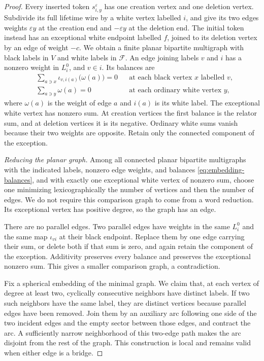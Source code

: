 \begin{proof}
Every inserted token $s_{i,y}^{\varepsilon}$ has one creation vertex
and one deletion vertex.  Subdivide its full lifetime wire by a white
vertex labelled $i$, and give its two edges weights $\varepsilon y$
at the creation end and $-\varepsilon y$ at the deletion end.  The
initial token instead has an exceptional white endpoint labelled $f$,
joined to its deletion vertex by an edge of weight $-c$.  We obtain
a finite planar bipartite multigraph with black labels in $V$ and
white labels in $\mathcal F$.  An edge joining labels $v$ and $i$
has a nonzero weight in $L_i^0$, and $v\in i$.  Its balances are
\begin{equation}\label{eq:embedding-balances}
\begin{aligned}
  &\sum_{a\ni x}\iota_{v,i(a)}\bigl(\omega(a)\bigr)=0
    &&\text{at each black vertex $x$ labelled $v$},\\
  &\sum_{a\ni y}\omega(a)=0
    &&\text{at each ordinary white vertex $y$},
\end{aligned}
\end{equation}
where $\omega(a)$ is the weight of edge $a$ and $i(a)$ is its white
label.  The exceptional white vertex has nonzero sum.  At creation
vertices the first balance is the relator sum, and at deletion
vertices it is its negative.  Ordinary white sums vanish because
their two weights are opposite.  Retain only the connected component
of the exception.

\emph{Reducing the planar graph.}
Among all connected planar bipartite multigraphs with the indicated
labels, nonzero edge weights, and balances
\eqref{eq:embedding-balances}, and with exactly one exceptional white
vertex of nonzero sum, choose one minimizing lexicographically the
number of vertices and then the number of edges.  We do not require
this comparison graph to come from a word reduction.  Its exceptional
vertex has positive degree, so the graph has an edge.

There are no parallel edges.  Two parallel edges have weights in the
same $L_i^0$ and the same map $\iota_{vi}$ at their black endpoint.
Replace them by one edge carrying their sum, or delete both if that
sum is zero, and again retain the component of the exception.
Additivity preserves every balance and preserves the exceptional
nonzero sum.  This gives a smaller comparison graph, a contradiction.

Fix a spherical embedding of the minimal graph.  We claim that, at
each vertex of degree at least two, cyclically consecutive neighbors
have distinct labels.  If two such neighbors have the same label,
they are distinct vertices because parallel edges have been removed.
Join them by an auxiliary arc following one side of the two incident
edges and the empty sector between those edges, and contract the
arc.  A sufficiently narrow neighborhood of this two-edge path
makes the arc disjoint from the rest of the graph.  This construction
is local and remains valid when either edge is a bridge.


\end{proof}
